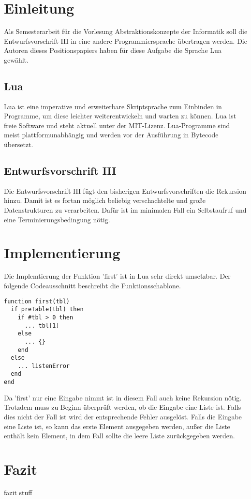 \chapter{Einleitung}

Als Semesterarbeit für die Vorlesung Abstraktionskonzepte der Informatik soll die Entwurfsvorschrift III in eine andere Programmiersprache übertragen werden. Die Autoren dieses Positionspapiers haben für diese Aufgabe die Sprache Lua gewählt.

\section{Lua}
Lua ist eine imperative und erweiterbare Skriptsprache zum Einbinden in Programme, um diese leichter weiterentwickeln und warten zu können. Lua ist freie Software und steht aktuell unter der MIT-Lizenz. Lua-Programme sind meist plattformunabhängig und werden vor der Ausführung in Bytecode übersetzt. 


\section{Entwurfsvorschrift III}
Die Entwurfsvorschrift III fügt den bisherigen Entwurfsvorschriften die Rekursion hinzu. Damit ist es fortan möglich beliebig verschachtelte und große Datenstrukturen zu verarbeiten. Dafür ist im minimalen Fall ein Selbstaufruf und eine Terminierungsbedingung nötig.

\chapter{Implementierung}

Die Implemtierung der Funktion 'first' ist in Lua sehr direkt umsetzbar. Der folgende Codeausschnitt beschreibt die Funktionsschablone.
\begin{lstlisting}
function first(tbl)
  if preTable(tbl) then
    if #tbl > 0 then
      ... tbl[1]
    else
      ... {}
    end
  else
    ... listenError
  end
end
\end{lstlisting}

Da 'first' nur eine Eingabe nimmt ist in diesem Fall auch keine Rekursion nötig. Trotzdem muss zu Beginn überprüft werden, ob die Eingabe eine Liste ist. Falls dies nicht der Fall ist wird der entsprechende Fehler ausgelöst. Falls die Eingabe eine Liste ist, so kann das erste Element ausgegeben werden, außer die Liste enthält kein Element, in dem Fall sollte die leere Liste zurückgegeben werden.

\chapter{Fazit}

fazit stuff

\printbibliography
{}

